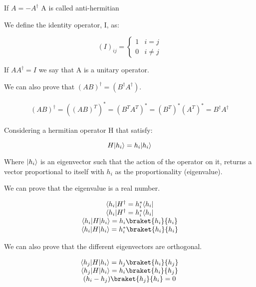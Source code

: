 If $A=-A^{\dagger}$ A is called anti-hermitian

We define the identity operator, I, as:

\begin{equation}
  (I)_{ij} = \left\{
  \begin{array}{lc}
    1 & i=j
    \\
    0 & i \neq j
  \end{array}
  \right.
\end{equation}

If $A A^{\dagger} = I$ we say that A is a unitary operator.

We can also prove that $(AB)^{\dagger} = (B^{\dagger}A^{\dagger})$.

\begin{equation}
  \begin{array}{c}
    (AB)^{\dagger} = ((AB)^T)^* = (B^TA^T)^*= (B^T)^*(A^T)^* = B^\dagger A^\dagger
  \end{array}
\end{equation}

Considering a hermitian operator H that satisfy:

\begin{equation}
  H\lvert h_i\rangle = h_i \lvert h_i\rangle
\end{equation}

Where $\lvert h_i\rangle$ is an eigenvector such that the action of the operator on it, returns a vector proportional to itself with $h_i$ as the proportionality (eigenvalue).

We can prove that the eigenvalue is a real number.

\begin{equation}
  \begin{array}{c}
    \bra{h_i}H^{\dagger} = h_i^* \bra{h_i}
    \\
    \bra{h_i}H^{\dagger} = h_i^* \bra{h_i}
    \\
    \bra{h_i}H\ket{h_i} = h_i \braket{h_i}{h_i}
    \\
    \bra{h_i}H\ket{h_i} = h_i^* \braket{h_i}{h_i}
  \end{array}
\end{equation}

We can also prove that the different eigenvectors are orthogonal.

\begin{equation}
  \begin{array}{c}
    \bra{h_j}H\ket{h_i} = h_j \braket{h_i}{h_j}
    \\
    \bra{h_j}H\ket{h_i} = h_i \braket{h_i}{h_j}
    \\
    (h_i-h_j)\braket{h_j}{h_i} = 0
  \end{array}
\end{equation}

